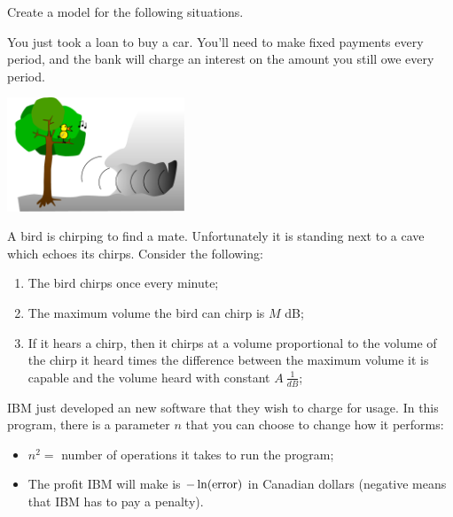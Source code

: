 \newpage

\begin{exercises}

	Create a model for the following situations.
	\begin{problist}
	\prob You just took a loan to buy a car. You'll need to make fixed payments every period, and the bank will charge an interest on the amount you still owe every period.

		\begin{center}
			\includegraphics*[width=150pt]{images/module25-chirping-echo.pdf}
		\end{center}

	\prob A bird is chirping to find a mate. Unfortunately it is standing next to a cave which echoes its chirps. Consider the following:

 
			\begin{enumerate}[label={(P$_{\arabic*}$) } ]
			\item The bird chirps once every minute;
			\item The maximum volume the bird can chirp is $M$ dB;
			\item If it hears a chirp, then it chirps at a volume proportional to the volume of the chirp it heard times the difference between the maximum volume it is capable and the volume heard with constant $A \ \frac{1}{dB}$;
			\end{enumerate}



	\prob IBM just developed an new software that they wish to charge for usage. In this program, there is a parameter $n$ that you can choose to change how it performs:
			\begin{itemize}
			\item $n^2 = $ number of operations it takes to run the program;
			\item The profit IBM will make is $- \ln({\rm error})$ in Canadian dollars (negative means that IBM has to pay a penalty).
			\end{itemize}
	

\end{problist}
\end{exercises}
